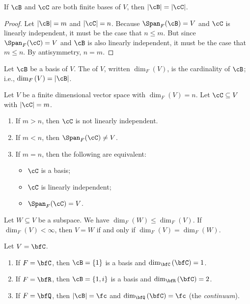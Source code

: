     \begin{corollary}
        If $\cB$ and $\cC$ are both finite bases of $V$, then $|\cB| = |\cC|$.
    \end{corollary}
        \begin{proof}
            Let $|\cB| = m$ and $|\cC| = n$. Because $\Span_F{(\cB)} = V$ and $\cC$ is linearly independent, it must be the case that $n \leq m$. But since $\Span_F{(\cC)} = V$ and $\cB$ is also linearly independent, it must be the case that $m \leq n$. By antisymmetry, $n = m$.
        \end{proof}

    \begin{definition}
        Let $\cB$ be a basis of $V$. The  of $V$, written $\dim_F{(V)}$, is the cardinality of $\cB$; i.e., $\dim_F{(V)} = |\cB|$.
    \end{definition}

    \begin{theorem}
        Let $V$ be a finite dimensional vector space with $\dim_F{(V)} = n$. Let $\cC \subseteq V$ with $|\cC| = m$.
            \begin{enumerate}[label = (\arabic*)]
                \item If $m > n$, then $\cC$ is not linearly independent.
                \item If $m < n$, then $\Span_F{(\cC)} \neq V$.
                \item If $m=n$, then the following are equivalent:
                    \begin{itemize}
                        \item $\cC$ is a basis;
                        \item $\cC$ is linearly independent;
                        \item $\Span_F{(\cC)} = V$.
                    \end{itemize}
            \end{enumerate}
    \end{theorem}

    \begin{corollary}
        Let $W \subseteq V$ be a subspace. We have $\dim_F{(W)} \leq \dim_F{(V)}$. If $\dim_F{(V)} < \infty$, then $V = W$ if and only if $\dim_F{(V)} = \dim_F{(W)}$.
    \end{corollary}

    \begin{example}
        Let $V = \bfC$.
            \begin{enumerate}[label = (\arabic*)]
                \item If $F = \bfC$, then $\cB = \{1\}$ is a basis and $\dim_{\bfC}{(\bfC)} = 1$.
                \item If $F = \bfR$, then $\cB = \{1,i\}$ is a basis and $\dim_{\bfR}{(\bfC)} = 2$.
                \item If $F = \bfQ$, then $|\cB| = \fc$ and $\dim_{\bfQ}{(\bfC)} = \fc$ (the \textit{continuum}).
            \end{enumerate}
    \end{example}

